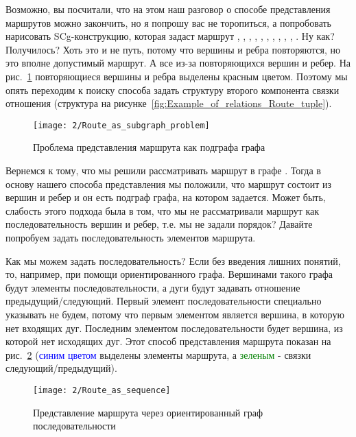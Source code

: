 Возможно, вы посчитали, что на этом наш разговор о способе
представления маршрутов можно закончить, но я попрошу вас не
торопиться, а попробовать нарисовать SCg-конструкцию, которая задаст
маршрут , , , , ,
, , , , ,
. Ну как? Получилось? Хоть это и не путь, потому что вершины и
ребра повторяются, но это вполне допустимый маршрут. А все из-за
повторяющихся вершин и ребер. На
рис.~\ref{fig:Route_as_subgraph_problem} повторяющиеся вершины и ребра
выделены красным цветом. Поэтому мы опять переходим к поиску способа
задать структуру второго компонента связки отношения 
(структура  на
рисунке~\ref{fig:Example_of_relations_Route_tuple}).

\begin{figure}
  \centering
  \texttt{[image: 2/Route\_as\_subgraph\_problem]}
  \caption{Проблема представления маршрута как подграфа графа }
  \label{fig:Route_as_subgraph_problem}
\end{figure}

Вернемся к тому, что мы решили рассматривать маршрут  в графе
. Тогда в основу нашего способа представления мы положили, что
маршрут состоит из вершин и ребер и он есть подграф графа, на котором
задается. Может быть, слабость этого подхода была в том, что мы не
рассматривали маршрут как последовательность вершин и ребер, т.е. мы
не задали порядок? Давайте попробуем задать последовательность
элементов маршрута.

Как мы можем задать последовательность? Если без введения лишних
понятий, то, например, при помощи ориентированного графа. Вершинами
такого графа будут элементы последовательности, а дуги будут задавать
отношение предыдущий/следующий. Первый элемент последовательности
специально указывать не будем, потому что первым элементом является
вершина, в которую нет входящих дуг. Последним элементом
последовательности будет вершина, из которой нет исходящих дуг. Этот
способ представления маршрута  показан на
рис.~\ref{fig:Route_as_sequence} (\textcolor{blue}{синим цветом}
выделены элементы маршрута, а \textcolor{green}{зеленым} - связки
следующий/предыдущий).

\begin{figure}
  \centering
  \texttt{[image: 2/Route\_as\_sequence]}
  \caption{Представление маршрута через ориентированный граф последовательности}
  \label{fig:Route_as_sequence}
\end{figure}

